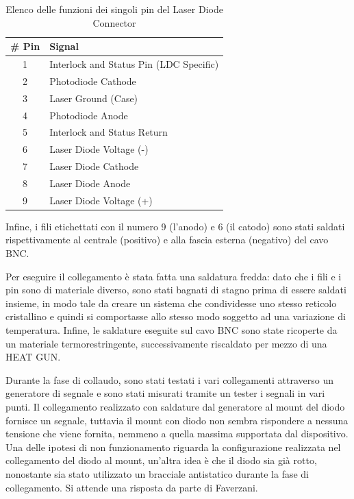 \documentclass{article}
\numberwithin{equation}{section}
\begin{document}
\begin{table}[htpb]
    \centering
    \begin{tabular}{c|l}
        \# Pin &	Signal \\
        \hline
        1 &	Interlock and Status Pin (LDC Specific) \\
        2 &	Photodiode Cathode \\
        3 &	Laser Ground (Case) \\
        4 &	Photodiode Anode \\
        5 &	Interlock and Status Return \\
        6 &	Laser Diode Voltage (-) \\
        7 &	Laser Diode Cathode \\
        8 &	Laser Diode Anode \\
        9 &	Laser Diode Voltage (+)
    \end{tabular}
    \caption{Elenco delle funzioni dei singoli pin del Laser Diode Connector}
    \label{tab:pinfunction}
\end{table}

\noindent Infine, i fili etichettati con il numero 9 (l'anodo) e 6 (il catodo) sono stati saldati rispettivamente al centrale (positivo) e alla fascia esterna (negativo) del cavo BNC.

\noindent Per eseguire il collegamento è stata fatta una saldatura fredda: dato che i fili e i pin sono di materiale diverso, sono stati bagnati di stagno prima di essere saldati insieme, in modo tale da creare un sistema che condividesse uno stesso reticolo cristallino e quindi si comportasse allo stesso modo soggetto ad una variazione di temperatura. Infine, le saldature eseguite sul cavo BNC sono state ricoperte da un materiale termorestringente, successivamente riscaldato per mezzo di una HEAT GUN. 

\noindent Durante la fase di collaudo, sono stati testati i vari collegamenti attraverso un generatore di segnale e  sono stati misurati tramite un tester i segnali in vari punti. Il collegamento realizzato con saldature dal generatore al mount del diodo fornisce un segnale, tuttavia il mount con diodo non sembra rispondere a nessuna tensione che viene fornita, nemmeno a quella massima supportata dal dispositivo. Una delle ipotesi di non funzionamento riguarda la configurazione realizzata nel collegamento del diodo al mount, un'altra idea è che il diodo sia già rotto, nonostante sia stato utilizzato un bracciale antistatico durante la fase di collegamento. Si attende una risposta da parte di Faverzani.
\end{document}
